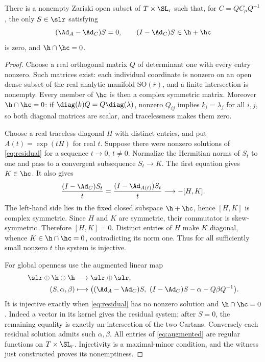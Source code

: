 \begin{proposition}\label{prop:residual}
There is a nonempty Zariski open subset of $T\times\SL_r$ such that,
for $C=QC_\mu Q^{-1}$, the only $S\in\slr$ satisfying
\begin{equation}\label{eq:residual}
 (\Ad_A-\Ad_C)S=0,\qquad (I-\Ad_C)S\in\h+\hc
\end{equation}
is zero, and $\h\cap\hc=0$.
\end{proposition}
\begin{proof}
Choose a real orthogonal matrix $Q$ of determinant one with every entry
nonzero. Such matrices exist: each individual coordinate is nonzero on
an open dense subset of the real analytic manifold $\mathrm{SO}(r)$,
and a finite intersection is nonempty. Every member of $\hc$ is then a
complex symmetric matrix. Moreover $\h\cap\hc=0$: if
$\diag(k)Q=Q\diag(\lambda)$, nonzero $Q_{ij}$ implies
$k_i=\lambda_j$ for all $i,j$, so both diagonal matrices are scalar, and
tracelessness makes them zero.

Choose a real traceless diagonal $H$ with distinct entries, and put
$A(t)=\exp(tH)$ for real $t$. Suppose there were nonzero solutions of
\eqref{eq:residual} for a sequence $t\to0$, $t\ne0$. Normalize the
Hermitian norms of $S_t$ to one and pass to a convergent subsequence
$S_t\to K$. The first equation gives $K\in\hc$. It also gives
\[
 \frac{(I-\Ad_C)S_t}{t}
 =\frac{(I-\Ad_{A(t)})S_t}{t}\longrightarrow-[H,K].
\]
The left-hand side lies in the fixed closed subspace $\h+\hc$, hence
$[H,K]$ is complex symmetric. Since $H$ and $K$ are symmetric, their
commutator is skew-symmetric. Therefore $[H,K]=0$. Distinct entries of
$H$ make $K$ diagonal, whence $K\in\h\cap\hc=0$, contradicting its
norm one. Thus for all sufficiently small nonzero $t$ the system is
injective.

For global openness use the augmented linear map
\begin{equation}\label{eq:augmented}
\begin{split}
 \slr\oplus\h\oplus\h&\longrightarrow\slr\oplus\slr,\\
 (S,\alpha,\beta)&\longmapsto
 \bigl((\Ad_A-\Ad_C)S,\ (I-\Ad_C)S-\alpha-Q\beta Q^{-1}\bigr).
\end{split}
\end{equation}
It is injective exactly when \eqref{eq:residual} has no nonzero solution
and $\h\cap\hc=0$. Indeed a vector in its kernel gives the residual
system; after $S=0$, the remaining equality is exactly an intersection
of the two Cartans. Conversely each residual solution admits such
$\alpha,\beta$. All entries of \eqref{eq:augmented} are regular functions
on $T\times\SL_r$. Injectivity is a maximal-minor condition, and the
witness just constructed proves its nonemptiness.
\end{proof}

